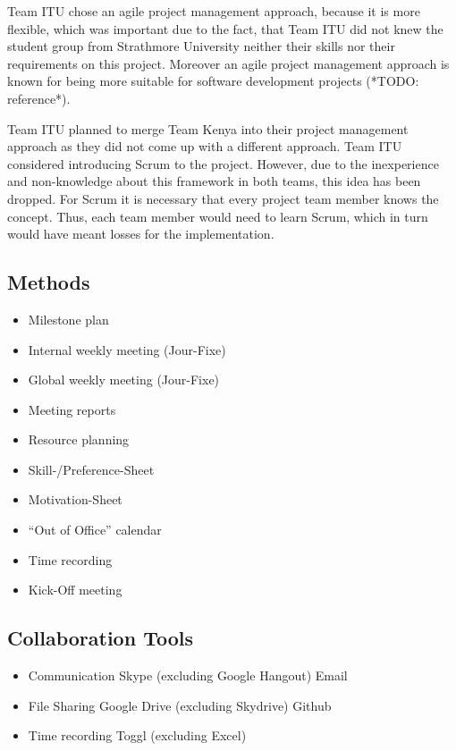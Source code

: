 Team ITU chose an agile project management approach, because it is more flexible, which was important due to the fact, that Team ITU did not knew the student group from Strathmore University neither their skills nor their requirements on this project. Moreover an agile project management approach is known for being more suitable for software development projects (*TODO: reference*).

Team ITU planned to merge Team Kenya into their project management approach as they did not come up with a different approach. Team ITU considered introducing Scrum to the project. However, due to the inexperience and non-knowledge about this framework in both teams, this idea has been dropped. For Scrum it is necessary that every project team member knows the concept. Thus, each team member would need to learn Scrum, which in turn would have meant losses for the implementation.


\subsection{Methods}

	\begin{itemize}
		\item Milestone plan
		\item Internal weekly meeting (Jour-Fixe)
		\item Global weekly meeting (Jour-Fixe)
		\item Meeting reports
		\item Resource planning
		\item Skill-/Preference-Sheet
		\item Motivation-Sheet
		\item “Out of Office” calendar
		\item Time recording
		\item Kick-Off meeting
	\end{itemize}


\subsection{Collaboration Tools}

	\begin{itemize}
		\item Communication
			\subitem Skype (excluding Google Hangout)
			\subitem Email
		\item File Sharing
			\subitem Google Drive (excluding Skydrive)
			\subitem Github
		\item Time recording
			\subitem Toggl (excluding Excel)
	\end{itemize}

